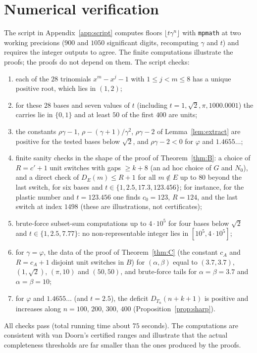 \documentclass[11pt]{amsart}
\theoremstyle{definition}
\theoremstyle{remark}
\newcommand{\fl}[1]{\lfloor #1\rfloor}
\begin{document}
\section{Numerical verification}\label{sec:num}

The script in Appendix~\ref{app:script} computes floors $\fl{t\gamma^n}$ with \texttt{mpmath}
at two working precisions ($900$ and $1050$ significant digits, recomputing $\gamma$ and $t$)
and requires the integer outputs to agree. The finite computations illustrate the proofs;
the proofs do not depend on them. The script checks:
\begin{enumerate}[label=C\arabic*.,leftmargin=2.5em]
\item each of the $28$ trinomials $x^m-x^j-1$ with $1\le j<m\le8$ has a unique positive root,
which lies in $(1,2)$;
\item for these $28$ bases and seven values of $t$ (including $t=1,\sqrt2,\pi,1000.0001$) the
carries lie in $\{0,1\}$ and at least $50$ of the first $400$ are units;
\item the constants $\rho\gamma-1$, $\rho-(\gamma+1)/\gamma^2$, $\rho\gamma-2$ of
Lemma~\ref{lem:extract} are positive for the tested bases below $\sqrt2$, and $\rho\gamma-2<0$ for
$\varphi$ and $1.4655\ldots$;
\item finite sanity checks in the shape of the proof of Theorem~\ref{thm:B}: a choice of
$R=c'+1$ unit switches with gaps $\ge k+8$ (an ad hoc choice of $G$ and $N_0$), and a direct
check of $D_E(m)\le R+1$ for all $m\notin E$ up to $80$ beyond the last switch, for six bases
and $t\in\{1,2.5,17.3,123.456\}$; for instance, for the plastic number and $t=123.456$ one finds
$c_0=123$, $R=124$, and the last switch at index $1498$ (these are illustrations, not
certificates);
\item brute-force subset-sum computations up to $4\cdot10^5$ for four bases below $\sqrt2$
and $t\in\{1,2.5,7.77\}$: no non-representable integer lies in $[10^5,4\cdot10^5]$;
\item for $\gamma=\varphi$, the data of the proof of Theorem~\ref{thm:C} (the constant $c_A$ and
$R=c_A+1$ disjoint unit switches in $B$) for
$(\alpha,\beta)$ equal to $(3.7,3.7)$, $(1,\sqrt2)$, $(\pi,10)$ and $(50,50)$, and brute-force
tails for $\alpha=\beta=3.7$ and $\alpha=\beta=10$;
\item for $\varphi$ and $1.4655\ldots$ (and $t=2.5$), the deficit $D_{T_n}(n+k+1)$ is positive
and increases along $n=100$, $200$, $300$, $400$ (Proposition~\ref{prop:sharp}).
\end{enumerate}
All checks pass (total running time about $75$ seconds). The computations are consistent with
van Doorn's certified ranges \cite{vD26} and illustrate that the actual completeness thresholds
are far smaller than the ones produced by the proofs.
\end{document}
